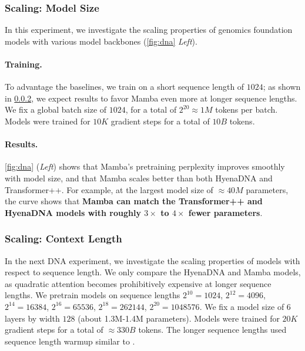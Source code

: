 \subsubsection{Scaling: Model Size}

In this experiment, we investigate the scaling properties of genomics foundation models with various model backbones (\ref{fig:dna} \textit{Left}).

\paragraph{Training.}
To advantage the baselines, we train on a short sequence length of $1024$; as shown in \ref{sec:exp:dna:length}, we expect results to favor Mamba even more at longer sequence lengths. We fix a global batch size of $1024$, for a total of $2^{20} \approx 1M$ tokens per batch. Models were trained for $10K$ gradient steps for a total of $10B$ tokens.

\paragraph{Results.}
\ref{fig:dna} (\emph{Left}) shows that Mamba's pretraining perplexity improves smoothly with model size, and that Mamba scales better than both HyenaDNA and Transformer++. For example, at the largest model size of $\approx 40M$ parameters, the curve shows that \textbf{Mamba can match the Transformer++ and HyenaDNA models with roughly $3\times$ to $4\times$ fewer parameters}.

\subsubsection{Scaling: Context Length}
\label{sec:exp:dna:length}

In the next DNA experiment, we investigate the scaling properties of models with respect to sequence length. We only compare the HyenaDNA and Mamba models, as quadratic attention becomes prohibitively expensive at longer sequence lengths. We pretrain models on sequence lengths $2^{10}=1024$, $2^{12}=4096$, $2^{14}=16384$, $2^{16}=65536$, $2^{18}=262144$, $2^{20}=1048576$. We fix a model size of 6 layers by width $128$ (about 1.3M-1.4M parameters). Models were trained for $20K$ gradient steps for a total of $\approx 330B$ tokens. The longer sequence lengths used sequence length warmup similar to \citep{nguyen2023hyenadna}.

